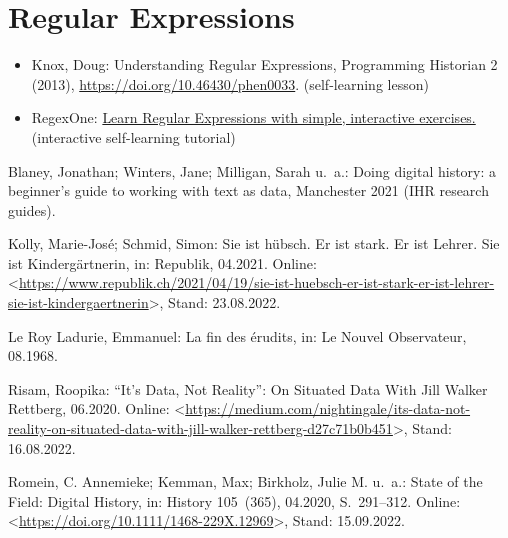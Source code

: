 \documentclass[
  letterpaper,
]{book}
\newlength{\cslhangindent}
\newlength{\cslentryspacingunit} %
\newenvironment{CSLReferences}[2] %
 {%
  \setlength{\parindent}{0pt}
  \ifodd #1
  \let\oldpar\par
  \def\par{\hangindent=\cslhangindent\oldpar}
  \fi
  \setlength{\parskip}{#2\cslentryspacingunit}
 }%
 {}
\begin{document}
\hypertarget{regular-expressions}{%
\section{Regular Expressions}\label{regular-expressions}}

\begin{itemize}
\item
  Knox, Doug: Understanding Regular Expressions, Programming Historian 2
  (2013), \url{https://doi.org/10.46430/phen0033}. (self-learning
  lesson)
\item
  RegexOne: \href{https://regexone.com/}{Learn Regular Expressions with
  simple, interactive exercises.} (interactive self-learning tutorial)
\end{itemize}

\hypertarget{refs}{}
\begin{CSLReferences}{0}{0}
\leavevmode{}%
Blaney, Jonathan; Winters, Jane; Milligan, Sarah u.~a.: Doing digital
history: a beginner's guide to working with text as data, Manchester
2021 ({IHR} research guides).

\leavevmode{}%
Kolly, Marie-José; Schmid, Simon: Sie ist h{ü}bsch. {Er} ist stark. {Er}
ist {Lehrer}. {Sie} ist {Kinderg{ä}rtnerin}, in: Republik, 04.2021.
Online:
\textless{}\url{https://www.republik.ch/2021/04/19/sie-ist-huebsch-er-ist-stark-er-ist-lehrer-sie-ist-kindergaertnerin}\textgreater,
Stand: 23.08.2022.

\leavevmode{}%
Le Roy Ladurie, Emmanuel: La fin des {é}rudits, in: Le Nouvel
Observateur, 08.1968.

\leavevmode{}%
Risam, Roopika: {``}{It}{'}s {Data}, {Not} {Reality}{''}: {On}
{Situated} {Data} {With} {Jill} {Walker} {Rettberg}, 06.2020. Online:
\textless{}\url{https://medium.com/nightingale/its-data-not-reality-on-situated-data-with-jill-walker-rettberg-d27c71b0b451}\textgreater,
Stand: 16.08.2022.

\leavevmode{}%
Romein, C. Annemieke; Kemman, Max; Birkholz, Julie M. u.~a.: State of
the {Field}: {Digital} {History}, in: History 105~(365), 04.2020,
S.~291--312. Online:
\textless{}\url{https://doi.org/10.1111/1468-229X.12969}\textgreater,
Stand: 15.09.2022.

\end{CSLReferences}


\backmatter
\end{document}
